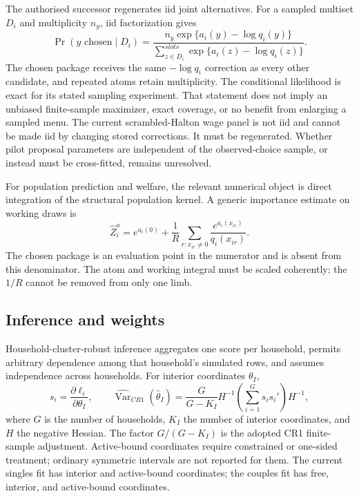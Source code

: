 \documentclass[11pt,a4paper]{article}
\begin{document}
The authorised successor regenerates iid joint alternatives. For a sampled
multiset $D_i$ and multiplicity $n_y$, iid factorization gives
\begin{equation}
\Pr(y\text{ chosen}\mid D_i)=
\frac{n_y\exp\{a_i(y)-\log q_i(y)\}}
{\sum_{z\in D_i}^{slots}\exp\{a_i(z)-\log q_i(z)\}}.
\label{eq:conditional}
\end{equation}
The chosen package receives the same $-\log q_i$ correction as every other
candidate, and repeated atoms retain multiplicity. The conditional likelihood
is exact for its stated sampling experiment. That statement does not imply an
unbiased finite-sample maximizer, exact coverage, or no benefit from enlarging a
sampled menu. The current scrambled-Halton wage panel is not iid and cannot be
made iid by changing stored corrections. It must be regenerated. Whether pilot
proposal parameters are independent of the observed-choice sample, or instead
must be cross-fitted, remains unresolved.

For population prediction and welfare, the relevant numerical object is direct
integration of the structural population kernel. A generic importance estimate
on working draws is
\begin{equation}
\widehat Z_i^a=e^{a_i(0)}+\frac{1}{R}\sum_{r:x_{ir}\neq0}
\frac{e^{a_i(x_{ir})}}{q_i(x_{ir})}.
\label{eq:direct}
\end{equation}
The chosen package is an evaluation point in the numerator and is absent from
this denominator. The atom and working integral must be scaled coherently; the
$1/R$ cannot be removed from only one limb.

\subsection{Inference and weights}

Household-cluster-robust inference aggregates one score per household, permits
arbitrary dependence among that household's simulated rows, and assumes
independence across households. For interior coordinates $\theta_I$,
\begin{equation}
s_i=\frac{\partial\ell_i}{\partial\theta_I},\qquad
\widehat{\operatorname{Var}}_{CR1}(\hat\theta_I)=
\frac{G}{G-K_I}H^{-1}\left(\sum_{i=1}^{G}s_is_i'\right)H^{-1},
\label{eq:cr1}
\end{equation}
where $G$ is the number of households, $K_I$ the number of interior coordinates,
and $H$ the negative Hessian. The factor $G/(G-K_I)$ is the adopted CR1
finite-sample adjustment. Active-bound coordinates require constrained or
one-sided treatment; ordinary symmetric intervals are not reported for them.
The current singles fit has \SingleInterior{} interior and \SingleBounds{}
active-bound coordinates; the couples fit has \CoupleFree{} free,
\CoupleInterior{} interior, and \CoupleBounds{} active-bound coordinates.
\end{document}
